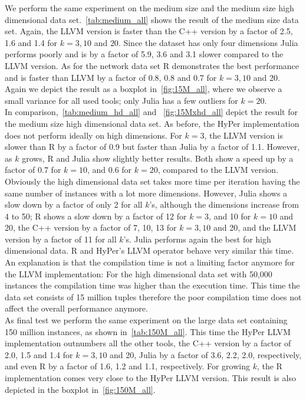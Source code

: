 We perform the same experiment on the medium size and the medium size high dimensional data set.~\autoref{tab:medium_all} shows the result of the medium size data set. Again, the LLVM version is faster than the C++ version by a factor of 2.5, 1.6 and 1.4 for $k = 3, 10$ and $20$. Since the dataset has only four dimensions Julia performs poorly and is by a factor of 5.9, 3.6 and 3.1 slower compared to the LLVM version. As for the network data set R demonstrates the best performance and is faster than LLVM by a factor of 0.8, 0.8 and 0.7 for $k = 3, 10$ and 20. Again we depict the result as a boxplot in~\autoref{fig:15M_all}, where we observe a small variance for all used tools; only Julia has a few outliers for $k = 20$.
\\
In comparison,~\autoref{tab:medium_hd_all} and ~\autoref{fig:15Mxhd_all} depict the result for the medium size high dimensional data set. As before, the HyPer implementation does not perform ideally on high dimensions. For $k = 3$, the LLVM version is slower than R by a factor of 0.9 but faster than Julia by a factor of 1.1. However, as $k$ grows, R and Julia show slightly better results. Both show a speed up by a factor of 0.7 for $k = 10$, and 0.6 for $k = 20$, compared to the LLVM version. 
\\
Obviously the high dimensional data set takes more time per iteration having the same number of instances with a lot more dimensions. However, Julia shows a slow down by a factor of only 2 for all $k$'s, although the dimensions increase from 4 to 50; R shows a slow down by a factor of 12 for $k = 3$, and 10 for $k = 10$ and 20, the C++ version by a factor of 7, 10, 13 for $k = 3, 10$ and 20, and the LLVM version by a factor of 11 for all $k$'s. Julia performs again the best for high dimensional data. R and HyPer's LLVM operator behave very similar this time. An explanation is that the compilation time is not a limiting factor anymore for the LLVM implementation: For the high dimensional data set with 50,000 instances the compilation time was higher than the execution time. This time the data set consists of 15 million tuples therefore the poor compilation time does not affect the overall performance anymore.
\\
As final test we perform the same experiment on the large data set containing 150 million instances, as shown in~\autoref{tab:150M_all}. This time the HyPer LLVM implementation outnumbers all the other tools, the C++ version by a factor of 2.0, 1.5 and 1.4 for $k = 3, 10$ and 20, Julia by a factor of 3.6, 2.2, 2.0, respectively, and even R by a factor of 1.6, 1.2 and 1.1, respectively. For growing $k$, the R implementation comes very close to the HyPer LLVM version. This result is also depicted in the boxplot in~\autoref{fig:150M_all}.
